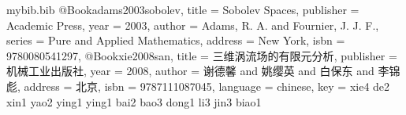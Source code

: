 \begin{filecontents}{mybib.bib}
  @Book{adams2003sobolev,
    title     = {Sobolev Spaces},
    publisher = {Academic Press},
    year      = {2003},
    author    = {Adams, R. A. and Fournier, J. J. F.},
    series    = {Pure and Applied Mathematics},
    address   = {New York},
    isbn      = {9780080541297},
  }
  @Book{xie2008san,
    title     = {三维涡流场的有限元分析},
    publisher = {机械工业出版社},
    year      = {2008},
    author    = {谢德馨 and 姚缨英 and 白保东 and 李锦彪},
    address   = {北京},
    isbn      = {9787111087045},
    language  = {chinese},
    key       = {xie4 de2 xin1 yao2 ying1 ying1 bai2 bao3 dong1 li3 jin3 biao1}
  }
\end{filecontents}